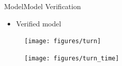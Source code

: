 
\begin{frame}{Model}{Model Verification}
    \begin{itemize}
        \item Verified model
    \end{itemize}
    \begin{minipage}{0.45\linewidth}
        \begin{figure}[H]
            \centering
            \texttt{[image: figures/turn]}
        \end{figure}        
    \end{minipage}\hfill      
    \begin{minipage}{0.45\linewidth}
        \begin{figure}[H]
            \centering
            \texttt{[image: figures/turn\_time]}
        \end{figure}                
    \end{minipage}\hfill \\
\end{frame}






